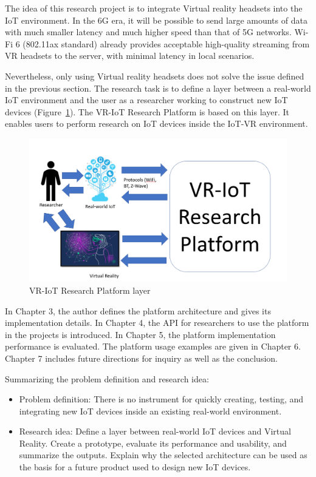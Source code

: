 The idea of this research project is to integrate Virtual reality headsets into the IoT environment. In the 6G era, it will be possible to send large amounts of data with much smaller latency and much higher speed than that of 5G networks. Wi-Fi 6 (802.11ax standard) already provides acceptable high-quality streaming from VR headsets to the server, with minimal latency in local scenarios.

Nevertheless, only using Virtual reality headsets does not solve the issue defined in the previous section. The research task is to define a layer between a real-world IoT environment and the user as a researcher working to construct new IoT devices (Figure~\ref{fig:VR-IoTResearchPlatformLayer-figure}). The VR-IoT Research Platform is based on this layer. It enables users to perform research on IoT devices inside the IoT-VR environment.

\begin{figure} 
  \centering
  \includegraphics[width=0.9\linewidth]{figures/VR-IoTResearchPlatformLayer.png}
  \caption{VR-IoT Research Platform layer}
  \label{fig:VR-IoTResearchPlatformLayer-figure}
\end{figure}

In Chapter 3, the author defines the platform architecture and gives its implementation details. In Chapter 4, the API for researchers to use the platform in the projects is introduced. In Chapter 5, the platform implementation performance is evaluated. The platform usage examples are given in Chapter 6. Chapter 7 includes future directions for inquiry as well as the conclusion.

Summarizing the problem definition and research idea:

\begin{itemize}
    \item Problem definition: There is no instrument for quickly creating, testing, and integrating new IoT devices inside an existing real-world environment.  
    \item Research idea: Define a layer between real-world IoT devices and Virtual Reality. Create a prototype, evaluate its performance and usability, and summarize the outputs. Explain why the selected architecture can be used as the basis for a future product used to design new IoT devices.
\end{itemize}












